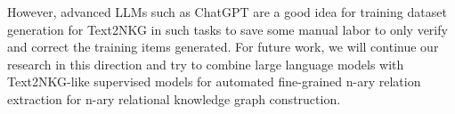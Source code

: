 \documentclass{article} \usepackage{iclr2024_conference,times}
\begin{document}
However, advanced LLMs such as ChatGPT are a good idea for training dataset generation for Text2NKG in such tasks to save some manual labor to only verify and correct the training items generated. For future work, we will continue our research in this direction and try to combine large language models with Text2NKG-like supervised models for automated fine-grained n-ary relation extraction for n-ary relational knowledge graph construction.
\end{document}
